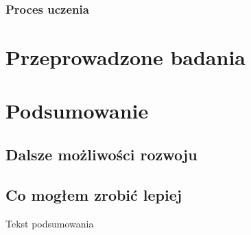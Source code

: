 \documentclass{report}
\begin{document}
    \subsection{Proces uczenia}

    \chapter{Przeprowadzone badania}

    \chapter{Podsumowanie}

    \section{Dalsze możliwości rozwoju}

    \section{Co mogłem zrobić lepiej}

    Tekst podsumowania

    
    

    \listoffigures
    \listoftables
\end{document}
